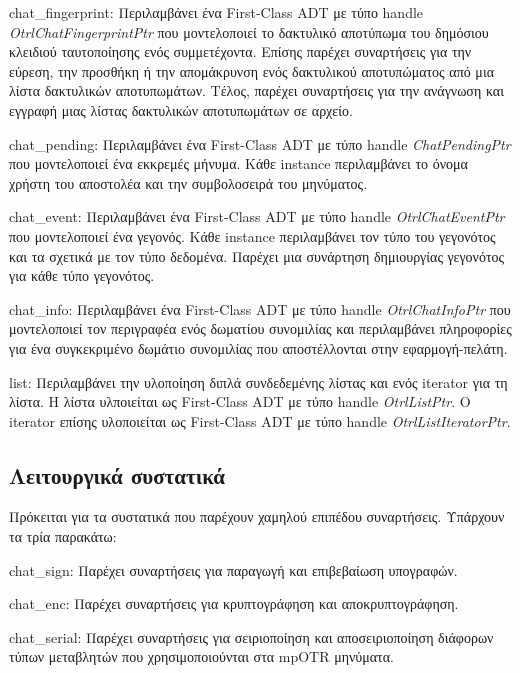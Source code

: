 \begin{description}
  \item chat\_fingerprint: Περιλαμβάνει ένα First-Class ADT με τύπο handle \emph{OtrlChatFingerprintPtr} που μοντελοποιεί το δακτυλικό αποτύπωμα του δημόσιου κλειδιού ταυτοποίησης ενός συμμετέχοντα. Επίσης παρέχει συναρτήσεις για την εύρεση, την προσθήκη ή την απομάκρυνση ενός δακτυλικού αποτυπώματος από μια λίστα δακτυλικών αποτυπωμάτων. Τέλος, παρέχει συναρτήσεις για την ανάγνωση και εγγραφή μιας λίστας δακτυλικών αποτυπωμάτων σε αρχείο.
  
  \item chat\_pending: Περιλαμβάνει ένα First-Class ADT με τύπο handle \emph{ChatPendingPtr} που μοντελοποιεί ένα εκκρεμές μήνυμα. Κάθε instance περιλαμβάνει το όνομα χρήστη του αποστολέα και την συμβολοσειρά του μηνύματος.
  
  \item chat\_event: Περιλαμβάνει ένα First-Class ADT με τύπο handle \emph{OtrlChatEventPtr} που μοντελοποιεί ένα γεγονός. Κάθε instance περιλαμβάνει τον τύπο του γεγονότος και τα σχετικά με τον τύπο δεδομένα. Παρέχει μια συνάρτηση δημιουργίας γεγονότος για κάθε τύπο γεγονότος.

  \item chat\_info:  Περιλαμβάνει ένα First-Class ADT με τύπο handle \emph{OtrlChatInfoPtr} που μοντελοποιεί τον περιγραφέα ενός δωματίου συνομιλίας και περιλαμβάνει πληροφορίες για ένα συγκεκριμένο δωμάτιο συνομιλίας που αποστέλλονται στην εφαρμογή-πελάτη.
  
  \item{list}: Περιλαμβάνει την υλοποίηση διπλά συνδεδεμένης λίστας και ενός iterator για τη λίστα. Η λίστα υλποιείται ως First-Class ADT με τύπο handle \emph{OtrlListPtr}. Ο iterator επίσης υλοποιείται ως First-Class ADT με τύπο handle \emph{OtrlListIteratorPtr}.
\end{description}


\subsection{Λειτουργικά συστατικά}
Πρόκειται για τα συστατικά που παρέχουν χαμηλού επιπέδου συναρτήσεις. Υπάρχουν τα τρία παρακάτω:

\begin{description}
  \item chat\_sign: Παρέχει συναρτήσεις για παραγωγή και επιβεβαίωση υπογραφών.

  \item chat\_enc: Παρέχει συναρτήσεις για κρυπτογράφηση και αποκρυπτογράφηση.

  \item chat\_serial: Παρέχει συναρτήσεις για σειριοποίηση και αποσειριοποίηση διάφορων τύπων μεταβλητών που χρησιμοποιούνται στα mpOTR μηνύματα.
\end{description}

